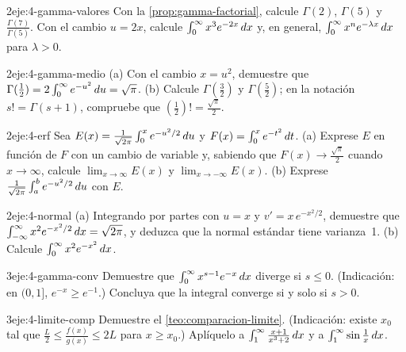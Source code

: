 \begin{ejercicio}{2}{eje:4-gamma-valores}
Con la \cref{prop:gamma-factorial}, calcule $\Gamma(2)$, $\Gamma(5)$ y $\frac{\Gamma(7)}{\Gamma(5)}$. Con el cambio $u=2x$, calcule $\int_0^{\infty}x^{3}e^{-2x}\mathop{}\!d x$ y, en general, $\int_0^{\infty}x^{n}e^{-\lambda x}\mathop{}\!d x$ para $\lambda>0$.
\end{ejercicio}

\begin{ejercicio}{2}{eje:4-gamma-medio}
(a) Con el cambio $x=u^{2}$, demuestre que $\Gamma(\frac12)=2\int_0^{\infty}e^{-u^{2}}\mathop{}\!d u=\sqrt\pi$. (b) Calcule $\Gamma(\frac32)$ y $\Gamma(\frac52)$; en la notación $s!=\Gamma(s+1)$, compruebe que $(\frac12)!=\frac{\sqrt\pi}{2}$.
\end{ejercicio}

\begin{ejercicio}{2}{eje:4-erf}
Sea $E(x)=\frac{1}{\sqrt{2\pi}}\int_0^{x}e^{-u^{2}/2}\mathop{}\!d u$ y $F(x)=\int_0^{x}e^{-t^{2}}\mathop{}\!d t$. (a) Exprese $E$ en función de $F$ con un cambio de variable y, sabiendo que $F(x)\to\frac{\sqrt\pi}{2}$ cuando $x\to\infty$, calcule $\lim_{x\to\infty}E(x)$ y $\lim_{x\to-\infty}E(x)$. (b) Exprese $\frac{1}{\sqrt{2\pi}}\int_a^{b}e^{-u^{2}/2}\mathop{}\!d u$ con $E$.
\end{ejercicio}

\begin{ejercicio}{2}{eje:4-normal}
(a) Integrando por partes con $u=x$ y $v'=x\,e^{-x^{2}/2}$, demuestre que $\int_{-\infty}^{\infty}x^{2}e^{-x^{2}/2}\mathop{}\!d x=\sqrt{2\pi}$, y deduzca que la normal estándar tiene varianza~1. (b) Calcule $\int_0^{\infty}x^{2}e^{-x^{2}}\mathop{}\!d x$.
\end{ejercicio}

\begin{ejercicio}{3}{eje:4-gamma-conv}
Demuestre que $\int_0^{\infty}x^{s-1}e^{-x}\mathop{}\!d x$ diverge si $s\le0$. (Indicación: en $(0,1]$, $e^{-x}\ge e^{-1}$.) Concluya que la integral converge si y solo si $s>0$.
\end{ejercicio}

\begin{ejercicio}{3}{eje:4-limite-comp}
Demuestre el \cref{teo:comparacion-limite}. (Indicación: existe $x_0$ tal que $\frac L2\le\frac{f(x)}{g(x)}\le2L$ para $x\ge x_0$.) Aplíquelo a $\int_1^{\infty}\frac{x+1}{x^{3}+2}\mathop{}\!d x$ y a $\int_1^{\infty}\sin\frac1x\mathop{}\!d x$.
\end{ejercicio}

